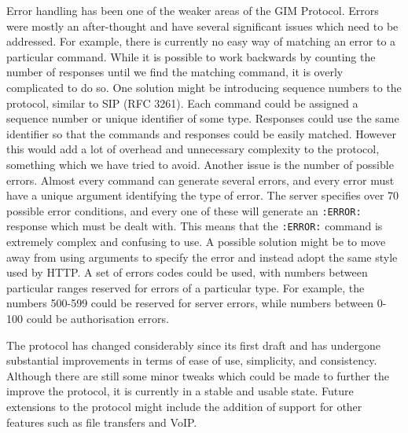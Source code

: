 Error handling has been one of the weaker areas of the GIM Protocol. Errors were mostly an after-thought and have several significant issues which need to be addressed. For example, there is currently no easy way of matching an error to a particular command. While it is possible to work backwards by counting the number of responses until we find the matching command, it is overly complicated to do so. One solution might be introducing sequence numbers to the protocol, similar to SIP (RFC 3261). Each command could be assigned a sequence number or unique identifier of some type. Responses could use the same identifier so that the commands and responses could be easily matched. However this would add a lot of overhead and unnecessary complexity to the protocol, something which we have tried to avoid. Another issue is the number of possible errors. Almost every command can generate several errors, and every error must have a unique argument identifying the type of error. The server specifies over 70 possible error conditions, and every one of these will generate an \texttt{:ERROR:} response which must be dealt with. This means that the \texttt{:ERROR:} command is extremely complex and confusing to use. A possible solution might be to move away from using arguments to specify the error and instead adopt the same style used by HTTP. A set of errors codes could be used, with numbers between particular ranges reserved for errors of a particular type. For example, the numbers 500-599 could be reserved for server errors, while numbers between 0-100 could be authorisation errors.

The protocol has changed considerably since its first draft and has undergone substantial improvements in terms of ease of use, simplicity, and consistency. Although there are still some minor tweaks which could be made to further the improve the protocol, it is currently in a stable and usable state. Future extensions to the protocol might include the addition of support for other features such as file transfers and VoIP.
